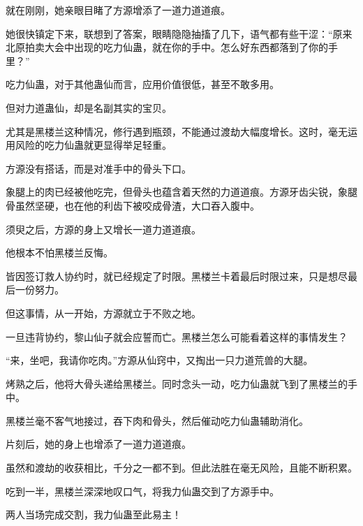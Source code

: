 \begin{this_body}
就在刚刚，她亲眼目睹了方源增添了一道力道道痕。

她很快镇定下来，联想到了答案，眼睛隐隐抽搐了几下，语气都有些干涩：“原来北原拍卖大会中出现的吃力仙蛊，就在你的手中。怎么好东西都落到了你的手里？”

吃力仙蛊，对于其他蛊仙而言，应用价值很低，甚至不敢多用。

但对力道蛊仙，却是名副其实的宝贝。

尤其是黑楼兰这种情况，修行遇到瓶颈，不能通过渡劫大幅度增长。这时，毫无运用风险的吃力仙蛊就更显得举足轻重。

方源没有搭话，而是对准手中的骨头下口。

象腿上的肉已经被他吃完，但骨头也蕴含着天然的力道道痕。方源牙齿尖锐，象腿骨虽然坚硬，也在他的利齿下被咬成骨渣，大口吞入腹中。

须臾之后，方源的身上又增长一道力道道痕。

他根本不怕黑楼兰反悔。

皆因签订救人协约时，就已经规定了时限。黑楼兰卡着最后时限过来，只是想尽最后一份努力。

但这事情，从一开始，方源就立于不败之地。

一旦违背协约，黎山仙子就会应誓而亡。黑楼兰怎么可能看着这样的事情发生？

“来，坐吧，我请你吃肉。”方源从仙窍中，又掏出一只力道荒兽的大腿。

烤熟之后，他将大骨头递给黑楼兰。同时念头一动，吃力仙蛊就飞到了黑楼兰的手中。

黑楼兰毫不客气地接过，吞下肉和骨头，然后催动吃力仙蛊辅助消化。

片刻后，她的身上也增添了一道力道道痕。

虽然和渡劫的收获相比，千分之一都不到。但此法胜在毫无风险，且能不断积累。

吃到一半，黑楼兰深深地叹口气，将我力仙蛊交到了方源手中。

两人当场完成交割，我力仙蛊至此易主！

\end{this_body}

